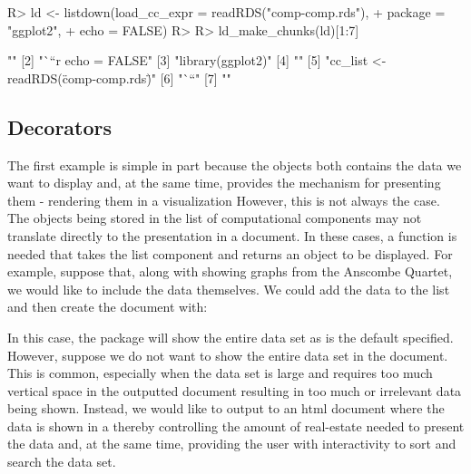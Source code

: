 \documentclass[
]{jss}
\begin{document}
\begin{CodeChunk}
\begin{CodeInput}
R> ld <- listdown(load_cc_expr = readRDS("comp-comp.rds"), 
+                package = "ggplot2",
+                echo = FALSE)
R> 
R> ld_make_chunks(ld)[1:7]
\end{CodeInput}
\begin{CodeOutput}
[1] ""                                     
[2] "```{r echo = FALSE}"                  
[3] "library(ggplot2)"                     
[4] ""                                     
[5] "cc_list <- readRDS(\"comp-comp.rds\")"
[6] "```"                                  
[7] ""                                     
\end{CodeOutput}
\end{CodeChunk}

\hypertarget{decorators}{%
\subsection{Decorators}\label{decorators}}

The first example is simple in part because the  objects
both contains the data we want to display and, at the same time,
provides the mechanism for presenting them - rendering them in a
visualization However, this is not always the case. The objects being
stored in the list of computational components may not translate
directly to the presentation in a document. In these cases, a function
is needed that takes the list component and returns an object to be
displayed. For example, suppose that, along with showing graphs from the
Anscombe Quartet, we would like to include the data themselves. We could
add the data to the  list and then create
the document with:

\begin{CodeChunk}
\end{CodeChunk}

In this case, the  package will show the entire data set
as is the default specified. However, suppose we do not want to show the
entire data set in the document. This is common, especially when the
data set is large and requires too much vertical space in the outputted
document resulting in too much or irrelevant data being shown. Instead,
we would like to output to an html document where the data is shown in a
 thereby controlling the amount of real-estate needed to
present the data and, at the same time, providing the user with
interactivity to sort and search the data set.
\end{document}
